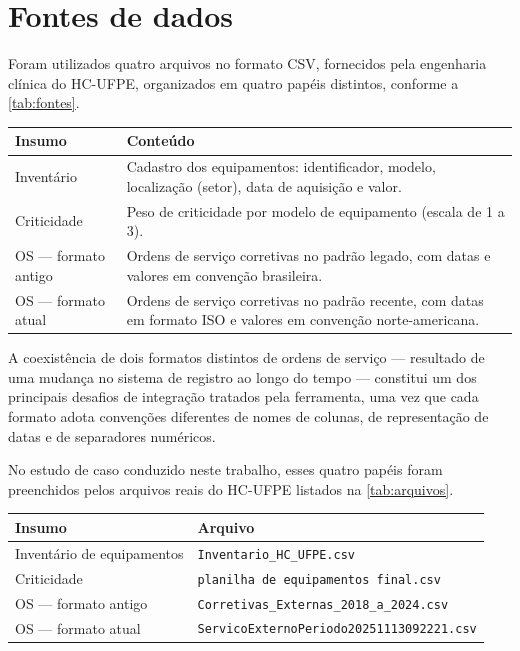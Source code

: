 \section{Fontes de dados}
\label{sec:fontes}

Foram utilizados quatro arquivos no formato CSV, fornecidos pela engenharia
clínica do HC-UFPE, organizados em quatro papéis distintos, conforme a
\ref{tab:fontes}.

\begin{table}[H]
    \centering
    \begin{tabular}{lp{9cm}}
        \hline
        \textbf{Insumo} & \textbf{Conteúdo} \\
        \hline
        Inventário & Cadastro dos equipamentos: identificador, modelo, localização (setor), data de aquisição e valor. \\
        Criticidade & Peso de criticidade por modelo de equipamento (escala de 1 a 3). \\
        OS --- formato antigo & Ordens de serviço corretivas no padrão legado, com datas e valores em convenção brasileira. \\
        OS --- formato atual & Ordens de serviço corretivas no padrão recente, com datas em formato ISO e valores em convenção norte-americana. \\
        \hline
    \end{tabular}
\end{table}

A coexistência de dois formatos distintos de ordens de serviço --- resultado de
uma mudança no sistema de registro ao longo do tempo --- constitui um dos
principais desafios de integração tratados pela ferramenta, uma vez que cada
formato adota convenções diferentes de nomes de colunas, de representação de
datas e de separadores numéricos.

No estudo de caso conduzido neste trabalho, esses quatro papéis foram preenchidos
pelos arquivos reais do HC-UFPE listados na \ref{tab:arquivos}.

\begin{table}[H]
    \centering
    \begin{tabular}{ll}
        \hline
        \textbf{Insumo} & \textbf{Arquivo} \\
        \hline
        Inventário de equipamentos & \texttt{Inventario\_HC\_UFPE.csv} \\
        Criticidade & \texttt{planilha de equipamentos final.csv} \\
        OS --- formato antigo & \texttt{Corretivas\_Externas\_2018\_a\_2024.csv} \\
        OS --- formato atual & \texttt{ServicoExternoPeriodo20251113092221.csv} \\
        \hline
    \end{tabular}
\end{table}

